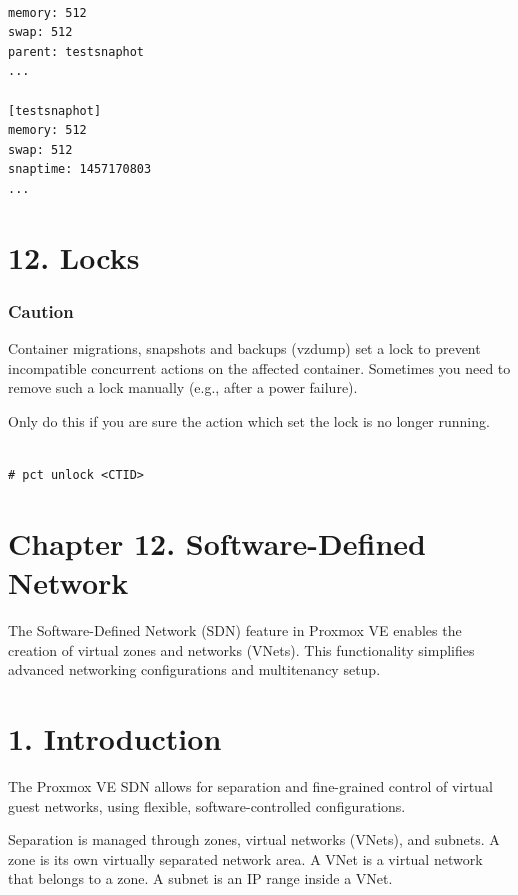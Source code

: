 \begin{lstlisting}

memory: 512
swap: 512
parent: testsnaphot
...

[testsnaphot]
memory: 512
swap: 512
snaptime: 1457170803
...

\end{lstlisting}


\section{12. Locks}

\subsubsection{Caution}

Container migrations, snapshots and backups (vzdump) set a lock to prevent incompatible concurrent actions on the affected container. Sometimes you need to remove such a lock manually (e.g., after a power failure).

Only do this if you are sure the action which set the lock is no longer running.

\begin{lstlisting}

# pct unlock <CTID>

\end{lstlisting}


\section{Chapter 12. Software-Defined Network}

The Software-Defined Network (SDN) feature in Proxmox VE enables the creation of virtual zones and networks (VNets). This functionality simplifies advanced networking configurations and multitenancy setup.


\section{1. Introduction}

The Proxmox VE SDN allows for separation and fine-grained control of virtual guest networks, using flexible, software-controlled configurations.

Separation is managed through zones, virtual networks (VNets), and subnets. A zone is its own virtually separated network area. A VNet is a virtual network that belongs to a zone. A subnet is an IP range inside a VNet.

